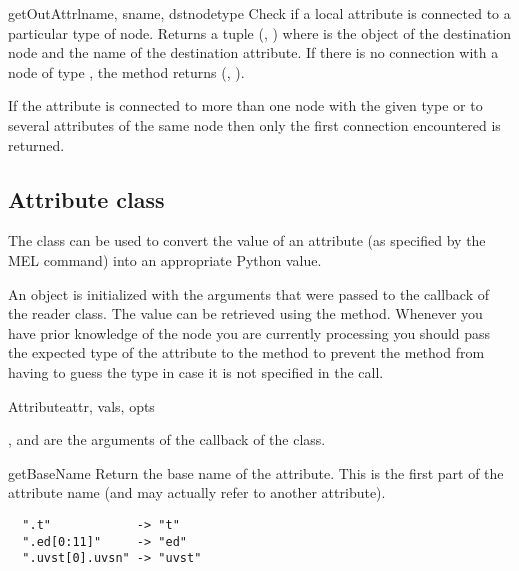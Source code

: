 \begin{methoddesc}{getOutAttr}{lname, sname, dstnodetype}
Check if a local attribute is connected to a particular type of node.
Returns a tuple (, ) where  is the
 object of the destination node and  the name of 
the destination attribute. If there is no connection with a node of
type , the method returns (, ).

If the attribute is connected to more than one node with the given
type or to several attributes of the same node then only the first
connection encountered is returned.
\end{methoddesc}

\subsection{Attribute class}

The  class can be used to convert the value of an
attribute (as specified by the  MEL command) into an
appropriate Python value.

An  object is initialized with the arguments that
were passed to the  callback of the reader
class. The value can be retrieved using the 
method. Whenever you have prior knowledge of the node you are 
currently processing you should pass the expected type of the
attribute to the  method to prevent the
method from having to guess the type in case it is not specified
in the  call.

\begin{classdesc}{Attribute}{attr, vals, opts}

,  and  are the arguments of the 
 callback of the  class.

\end{classdesc}

\begin{methoddesc}{getBaseName}{}
Return the base name of the attribute. This is the first part of the
attribute name (and may actually refer to another attribute).

\begin{verbatim}
  ".t"            -> "t"
  ".ed[0:11]"     -> "ed"
  ".uvst[0].uvsn" -> "uvst"
\end{verbatim}
\end{methoddesc}


